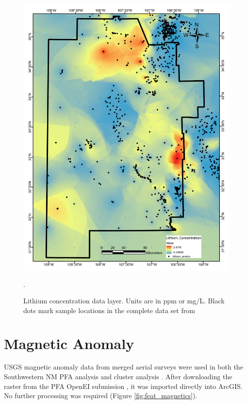 \begin{figure}[H]
\centering
\includegraphics[width=0.75\linewidth]{templates/images/Figure-Lithium.pdf}
\caption[Lithium concentration data layer]{Lithium concentration data layer. Units are in ppm or mg/L. Black dots mark sample locations in the complete data set from \protect\citet{bielicki_hydrogeolgic_2015}}.
\label{fig:feat_lithium}
\end{figure}
\pagebreak

\section{Magnetic Anomaly}\label{app:dl_magnetic_anomaly}
USGS magnetic anomaly data from merged aerial surveys \citep{bankey_digital_2002} were used in both the Southwestern NM PFA analysis \citep{bielicki_hydrogeolgic_2015} and cluster analysis \citep{pepin_new_2019}. After downloading the raster from the PFA OpenEI submission \citep{kelley_geothermal_2015}, it was imported directly into ArcGIS. No further processing was required (Figure \ref{fig:feat_magnetics}).

